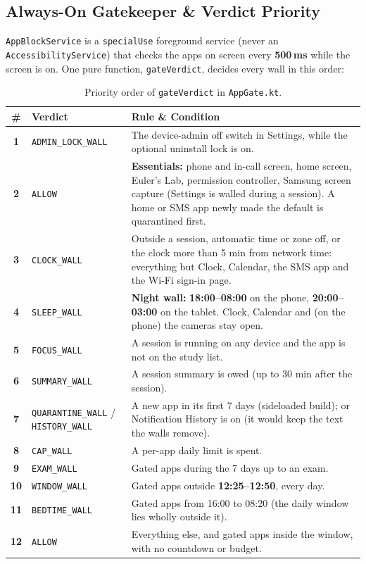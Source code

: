 \documentclass[11pt,a4paper]{article}
\begin{document}
\subsection{Always-On Gatekeeper \& Verdict Priority}
\texttt{AppBlockService} is a \texttt{specialUse} foreground service (never an \texttt{AccessibilityService}) that checks the apps on screen every \textbf{500\,ms} while the screen is on. One pure function, \texttt{gateVerdict}, decides every wall in this order:

\begin{table}[H]
\centering
\small
\begin{tabularx}{\textwidth}{@{}c L{3.6cm} Y@{}}
\toprule
\textbf{\sffamily \#} & \textbf{\sffamily Verdict} & \textbf{\sffamily Rule \& Condition} \\
\midrule
\textbf{1} & \texttt{ADMIN\_LOCK\_WALL} & The device-admin off switch in Settings, while the optional uninstall lock is on. \\
\textbf{2} & \texttt{ALLOW} & \textbf{Essentials:} phone and in-call screen, home screen, Euler's Lab, permission controller, Samsung screen capture (Settings is walled during a session). A home or SMS app newly made the default is quarantined first. \\
\textbf{3} & \texttt{CLOCK\_WALL} & Outside a session, automatic time or zone off, or the clock more than 5 min from network time: everything but Clock, Calendar, the SMS app and the Wi-Fi sign-in page. \\
\textbf{4} & \texttt{SLEEP\_WALL} & \textbf{Night wall:} \textbf{18:00--08:00} on the phone, \textbf{20:00--03:00} on the tablet. Clock, Calendar and (on the phone) the cameras stay open. \\
\textbf{5} & \texttt{FOCUS\_WALL} & A session is running on any device and the app is not on the study list. \\
\textbf{6} & \texttt{SUMMARY\_WALL} & A session summary is owed (up to 30 min after the session). \\
\textbf{7} & \texttt{QUARANTINE\_WALL} / \texttt{HISTORY\_WALL} & A new app in its first 7 days (sideloaded build); or Notification History is on (it would keep the text the walls remove). \\
\textbf{8} & \texttt{CAP\_WALL} & A per-app daily limit is spent. \\
\textbf{9} & \texttt{EXAM\_WALL} & Gated apps during the 7 days up to an exam. \\
\textbf{10} & \texttt{WINDOW\_WALL} & Gated apps outside \textbf{12:25--12:50}, every day. \\
\textbf{11} & \texttt{BEDTIME\_WALL} & Gated apps from 16:00 to 08:20 (the daily window lies wholly outside it). \\
\textbf{12} & \texttt{ALLOW} & Everything else, and gated apps inside the window, with no countdown or budget. \\
\bottomrule
\end{tabularx}
\caption{Priority order of \texttt{gateVerdict} in \texttt{AppGate.kt}.}
\end{table}
\end{document}
